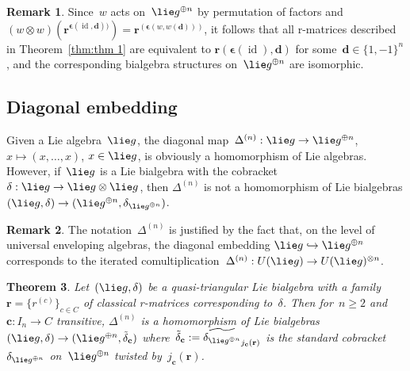 \documentclass[12pt, reqno]{amsart}
\newtheorem{theorem}{Theorem}[section]
\theoremstyle{definition}
\newtheorem{remark}[theorem]{Remark}
\numberwithin{equation}{section}
\newcommand{\tensor}{\otimes}
\DeclareMathOperator{\id}{id}
\newcommand{\sgna}[1]{\boldsymbol{\epsilon}(#1)}
\begin{document}
\begin{remark}\label{rem:isom permutations}
Since~$w$ acts on~$\lie g^{\oplus n}$ by permutation of factors and $(w\tensor w)(\mathbf r^{\sgna{\id,
\boldsymbol d})})=\mathbf r^{(\sgna{w,w(\boldsymbol d)})}$,
it follows that all r-matrices described in Theorem~\ref{thm:thm 1} are equivalent
to $\mathbf r(\sgna{\id},\boldsymbol d)$
for some~$\boldsymbol d\in \{1,-1\}^n$,
and the corresponding bialgebra 
structures on~$\lie g^{\oplus n}$ are isomorphic.
\end{remark}

\subsection{Diagonal embedding}
Given a Lie algebra~$\lie g$, the diagonal map~$\Delta^{(n)}:\lie g\to \lie g^{\oplus n}$,
$x\mapsto (x,\dots,x)$, $x\in \lie g$, is obviously a homomorphism of Lie algebras.
However, if~$\lie g$ is a Lie bialgebra with the cobracket~$\delta:\lie g\to 
\lie g\tensor\lie g$, then $\Delta^{(n)}$
is not a homomorphism of Lie bialgebras $(\lie g,\delta)\to 
(\lie g^{\oplus n},\delta_{\lie g^{\oplus n}})$.
\begin{remark}
The notation~$\Delta^{(n)}$ is justified by the fact that, on the level of universal enveloping algebras, the diagonal embedding $\lie g\hookrightarrow \lie g^{\oplus n}$
corresponds to the iterated comultiplication~$\Delta^{(n)}:U(\lie g)\to U(\lie g)^{\tensor n}$.
\end{remark}
\begin{theorem}\label{thm:diag embed bialg}
Let~$(\lie g,\delta)$ be a quasi-triangular Lie bialgebra with a family~$\mathbf r=\{r^{(c)}\}_{c\in C}$ of classical r-matrices corresponding to~$\delta$. 
Then for~$n\ge 2$ and $\mathbf c:I_n\to C$ transitive, $\Delta^{(n)}$ is a homomorphism of Lie bialgebras
$(\lie g,\delta)\to (\lie g^{\oplus n},\tilde\delta_{\mathbf c})$ where~$\tilde\delta_{\mathbf c}:=\widetilde{\delta_{\lie g^{\oplus n}}}_{j_{\mathbf c}(\mathbf r)}$
is the standard cobracket~$\delta_{\lie g^{\oplus n}}$ on~$\lie g^{\oplus n}$ twisted by~$j_{\mathbf c}(\mathbf r)$.
\end{theorem}
\end{document}
